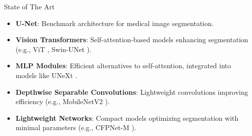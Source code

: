 \documentclass[aspectratio=169,xcolor=dvipsnames]{beamer}
\begin{document}
\begin{frame}[allowframebreaks]{State of The Art}
    \begin{itemize}
        \item \textbf{U-Net}: Benchmark architecture for medical image segmentation.  
        \item \textbf{Vision Transformers}: Self-attention-based models enhancing segmentation (e.g., ViT \cite{alexey2020image}, Swin-UNet \cite{cao2022swin}). %
        \item \textbf{MLP Modules}: Efficient alternatives to self-attention, integrated into models like UNeXt \cite{chang2024unext}.  
        \item \textbf{Depthwise Separable Convolutions}: Lightweight convolutions improving efficiency (e.g., MobileNetV2 \cite{sandler2018mobilenetv2}).  
        \item \textbf{Lightweight Networks}: Compact models optimizing segmentation with minimal parameters (e.g., CFPNet-M \cite{lou2023cfpnet}).
    \end{itemize}

    \framebreak
    \begin{columns}
        \centering
        \begin{table}[t]
            \footnotesize
            
        \end{table}
    
        \centering
        \begin{table}[t]
            \footnotesize
            
        \end{table}
    \end{columns}
    
    


        
\end{frame}
\end{document}
